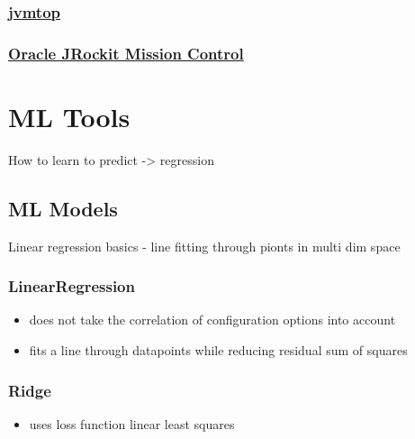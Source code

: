 \subsubsection{\href{https://github.com/patric-r/jvmtop}{jvmtop}}



\subsubsection{\href{http://www.oracle.com/technetwork/middleware/jrockit/overview/index-090630.html}{Oracle JRockit Mission Control}}



\section{ML Tools}

How to learn to predict -> regression

\subsection{ML Models}
Linear regression basics - line fitting through pionts in multi dim space

\subsubsection{LinearRegression}
\begin{itemize}
	\item does not take the correlation of configuration options into account
	\item fits a line through datapoints while reducing residual sum of squares
\end{itemize}
\subsubsection{Ridge}
\begin{itemize}
	\item uses loss function linear least squares
\end{itemize}
